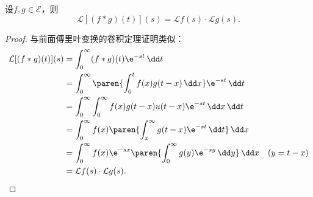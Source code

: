 \begin{theorem}[卷积定理]
    设$f,g\in\mathcal{E}$，则
    \begin{equation}
        \mathcal{L}[(f*g)(t)](s)=\mathcal{L}f(s)\cdot\mathcal{L}g(s).
    \end{equation}
\end{theorem}
\begin{proof}
    与前面傅里叶变换的卷积定理证明类似：
    \begin{align}
        \mathcal{L}[(f*g)(t)](s)&=\int_0^{\infty}(f*g)(t)\e^{-st}\,\dd t\nonumber\\
        &=\int_0^{\infty}\paren{\int_0^t f(x)g(t-x)\,\dd x}\e^{-st}\,\dd t\nonumber\\
        &=\int_0^{\infty}\int_0^{\infty}f(x)g(t-x)u(t-x)\e^{-st}\,\dd x\,\dd t\nonumber\\
        &=\int_0^{\infty}f(x)\paren{\int_x^{\infty}g(t-x)\e^{-st}\,\dd t}\,\dd x\nonumber\\
        &=\int_0^{\infty}f(x)\e^{-sx}\paren{\int_0^{\infty}g(y)\e^{-sy}\,\dd y}\,\dd x&(y=t-x)\nonumber\\
        &=\mathcal{L}f(s)\cdot\mathcal{L}g(s).
    \end{align}
\end{proof}

